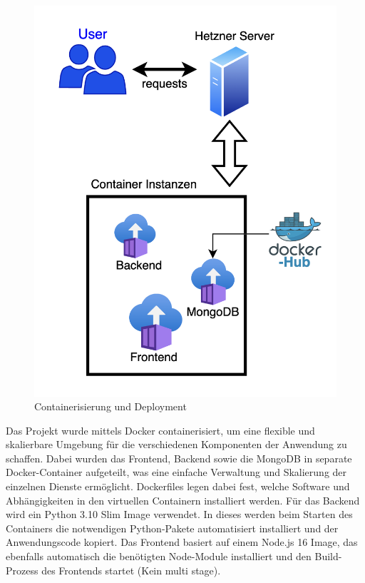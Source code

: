 \documentclass[conference,a4paper,flushend]{cs-techrep}
\begin{document}
\begin{figure}[h]
	\centering
	\includegraphics[width=\linewidth]{../Bilder/Deployment.png}
	\caption{Containerisierung und Deployment}
	\label{fig:Deployment}
\end{figure}

Das Projekt wurde mittels Docker \cite{docker} containerisiert, um eine flexible und skalierbare Umgebung für die verschiedenen Komponenten der Anwendung zu schaffen.
Dabei wurden das Frontend, Backend sowie die MongoDB \cite{mongodb} in separate Docker-Container aufgeteilt, was eine einfache Verwaltung und Skalierung der einzelnen Dienste ermöglicht. Dockerfiles legen dabei fest, welche Software und Abhängigkeiten in den virtuellen Containern installiert werden. Für das Backend wird ein Python 3.10 \cite{python} Slim Image verwendet. In dieses werden beim Starten des Containers die notwendigen Python-Pakete automatisiert installiert und der Anwendungscode kopiert. Das Frontend basiert auf einem Node.js \cite{node} 16 Image, das ebenfalls automatisch die benötigten Node-Module installiert und den Build-Prozess des Frontends startet (Kein multi stage).
\end{document}
